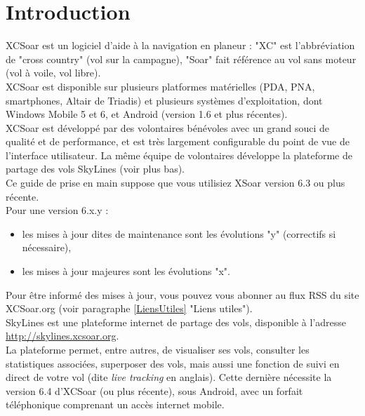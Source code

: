 \documentclass{article}
\begin{document}
\section{Introduction}
\noindent
XCSoar est un logiciel d'aide à la navigation en planeur : "XC" est l'abbréviation de "cross country" (vol sur la campagne), "Soar" fait référence au vol sans moteur (vol à voile, vol libre).\\
%
\newline
%
XCSoar est disponible sur plusieurs platformes matérielles (PDA, PNA, smartphones, Altair de Triadis) et plusieurs systèmes d'exploitation, dont Windows Mobile 5 et 6, et Android (version 1.6 et plus récentes).\\
%
\newline
%
XCSoar est développé par des volontaires bénévoles avec un grand souci de qualité et de performance, et est très largement configurable du point de vue de l'interface utilisateur. La même équipe de volontaires développe la plateforme de partage des vols SkyLines (voir plus bas).\\
Ce guide de prise en main suppose que vous utilisiez XSoar version 6.3 ou plus récente.\\
Pour une version 6.x.y :
\begin{itemize}
\item les mises à jour dites de maintenance sont les évolutions "y" (correctifs si nécessaire),
\item les mises à jour majeures sont les évolutions "x".
\end{itemize}
%
Pour être informé des mises à jour, vous pouvez vous abonner au flux RSS du site XCSoar.org (voir paragraphe \ref{LiensUtiles} "Liens utiles").\\
%
\newline
SkyLines est une plateforme internet de partage des vols, disponible à l'adresse \url{http://skylines.xcsoar.org}.\\
La plateforme permet, entre autres, de visualiser ses vols, consulter les statistiques associées, superposer des vols, mais aussi une fonction de suivi en direct de votre vol (dite \textit{live tracking} en anglais). Cette dernière nécessite la version 6.4 d'XCSoar (ou plus récente), sous Android, avec un forfait téléphonique comprenant un accès internet mobile.\\
%
\end{document}

